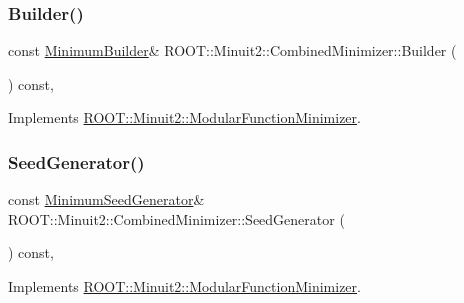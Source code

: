 \mbox{\label{classROOT_1_1Minuit2_1_1CombinedMinimizer_a73befc9c0bdfe8c9f09638505772c5ed}} 
\subsubsection{\texorpdfstring{Builder()}{Builder()}\hspace{0.1cm}{\footnotesize\ttfamily [2/2]}}
{\footnotesize\ttfamily const \mbox{\hyperlink{classROOT_1_1Minuit2_1_1MinimumBuilder}{Minimum\+Builder}}\& R\+O\+O\+T\+::\+Minuit2\+::\+Combined\+Minimizer\+::\+Builder (\begin{DoxyParamCaption}{ }\end{DoxyParamCaption}) const\hspace{0.3cm}{\ttfamily [inline]}, {\ttfamily [virtual]}}



Implements \mbox{\hyperlink{classROOT_1_1Minuit2_1_1ModularFunctionMinimizer_a13e98551cf14e927c61e1e34ecf8ba8b}{R\+O\+O\+T\+::\+Minuit2\+::\+Modular\+Function\+Minimizer}}.

\mbox{\label{classROOT_1_1Minuit2_1_1CombinedMinimizer_a667ce6c321b6948d37087a2ac06be58c}} 
\subsubsection{\texorpdfstring{SeedGenerator()}{SeedGenerator()}\hspace{0.1cm}{\footnotesize\ttfamily [1/2]}}
{\footnotesize\ttfamily const \mbox{\hyperlink{classROOT_1_1Minuit2_1_1MinimumSeedGenerator}{Minimum\+Seed\+Generator}}\& R\+O\+O\+T\+::\+Minuit2\+::\+Combined\+Minimizer\+::\+Seed\+Generator (\begin{DoxyParamCaption}{ }\end{DoxyParamCaption}) const\hspace{0.3cm}{\ttfamily [inline]}, {\ttfamily [virtual]}}



Implements \mbox{\hyperlink{classROOT_1_1Minuit2_1_1ModularFunctionMinimizer_a742930de97b0ce9ba23773874ae0894b}{R\+O\+O\+T\+::\+Minuit2\+::\+Modular\+Function\+Minimizer}}.

